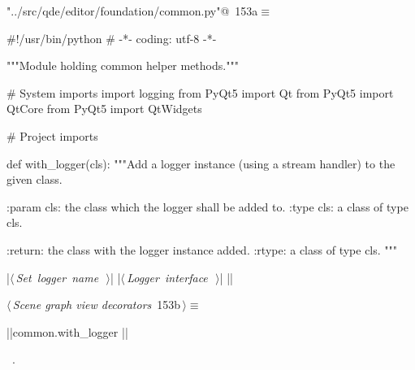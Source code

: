 \documentclass[%
    a4paper,    %
    justified,  %
    nobib,      %
    openany     %
]{tufte-book}
\begin{document}
\begin{flushleft} \small
\begin{minipage}{\linewidth}\label{scrap176}\raggedright\small
{} \verb@"../src/qde/editor/foundation/common.py"@\nobreak\ {\footnotesize {153a}}$\equiv$
\vspace{-1ex}
\begin{pythoncode}
#!/usr/bin/python
# -*- coding: utf-8 -*-

"""Module holding common helper methods."""

# System imports
import logging
from PyQt5 import Qt
from PyQt5 import QtCore
from PyQt5 import QtWidgets

# Project imports


def with_logger(cls):
    """Add a logger instance (using a stream handler) to the given class.

    :param cls: the class which the logger shall be added to.
    :type  cls: a class of type cls.

    :return: the class with the logger instance added.
    :rtype:  a class of type cls.
    """

    |\hbox{$\langle\,${\itshape Set logger name}\nobreak\ {\footnotesize {}}$\,\rangle$}|
    |\hbox{$\langle\,${\itshape Logger interface}\nobreak\ {\footnotesize {}}$\,\rangle$}|
|\NWsep|
\end{pythoncode}
\vspace{1.5ex}
\footnotesize
\begin{list}{}{\setlength{\itemsep}{-\parsep}\setlength{\itemindent}{-\leftmargin}}

\item{}
\end{list}
\end{minipage}\vspace{4ex}
\end{flushleft}
\begin{flushleft} \small
\begin{minipage}{\linewidth}\label{scrap177}\raggedright\small
{} $\langle\,${\itshape Scene graph view decorators}\nobreak\ {\footnotesize {153b}}$\,\rangle\equiv$
\vspace{-1ex}
\begin{pythoncode}
|\normalfont{}\fontfamily{}|common.with_logger
|\NWsep|
\end{pythoncode}
\vspace{1.5ex}
\footnotesize
\begin{list}{}{\setlength{\itemsep}{-\parsep}\setlength{\itemindent}{-\leftmargin}}
\item \NWtxtMacroRefIn\ .

\item{}
\end{list}
\end{minipage}\vspace{4ex}
\end{flushleft}
\end{document}
